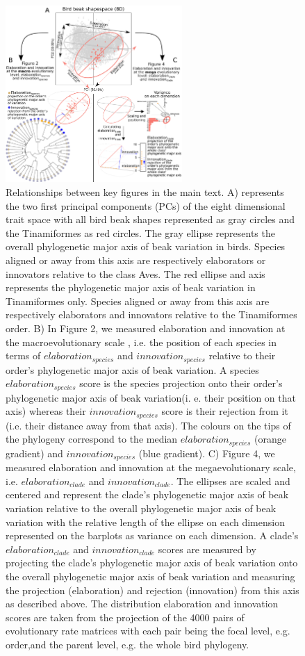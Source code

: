 \documentclass[12pt,letterpaper]{article}
\begin{document}
\begin{figure}[!htbp]
\centering
   \includegraphics[width=0.6\textwidth]{Figures/cheat_sheet.pdf}
\caption{\scriptsize{Relationships between key figures in the main text.
A) represents the two first principal components (PCs) of the eight dimensional trait space with all bird beak shapes represented as gray circles and the Tinamiformes as red circles.
The gray ellipse represents the overall phylogenetic major axis of beak variation in birds.
Species aligned or away from this axis are respectively elaborators or innovators relative to the class Aves.
The red ellipse and axis represents the phylogenetic major axis of beak variation in Tinamiformes only.
Species aligned or away from this axis are respectively elaborators and innovators relative to the Tinamiformes order.
B) In Figure 2, we measured elaboration and innovation at the macroevolutionary scale , i.e. the position of each species in terms of $elaboration_{species}$ and $innovation_{species}$ relative to their order's phylogenetic major axis of beak variation.
A species $elaboration_{species}$ score is the species projection onto their order's phylogenetic major axis of beak variation(i. e. their position on that axis) whereas their $innovation_{species}$ score is their rejection from it (i.e. their distance away from that axis).
The colours on the tips of the phylogeny correspond to the median $elaboration_{species}$ (orange gradient) and $innovation_{species}$ (blue gradient).
C) Figure 4, we measured elaboration and innovation at the megaevolutionary scale, i.e. $elaboration_{clade}$ and $innovation_{clade}$.
The ellipses are scaled and centered and represent the clade's phylogenetic major axis of beak variation relative to the overall phylogenetic major axis of beak variation with the relative length of the ellipse on each dimension represented on the barplots as variance on each dimension.
A clade's $elaboration_{clade}$ and $innovation_{clade}$ scores are measured by projecting the clade's phylogenetic major axis of beak variation onto the overall phylogenetic major axis of beak variation and measuring the projection (elaboration) and rejection (innovation) from this axis as described above.
The distribution elaboration and innovation scores are taken from the projection of the 4000 pairs of evolutionary rate matrices with each pair being the focal level, e.g. order,and the parent level, e.g. the whole bird phylogeny.}}
\label{Fig:cheatsheet}
\end{figure}
\end{document}

